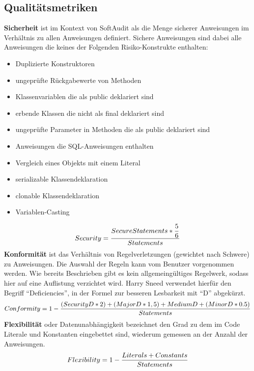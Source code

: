 \documentclass[gb,ngerman]{stthesis}
\begin{document}
		\subsection{Qualitätsmetriken}
			\textbf{Sicherheit} ist im Kontext von SoftAudit als die Menge sicherer Anweisungen im Verhältnis zu allen Anweisungen definiert. Sichere Anweisungen sind dabei alle Anweisungen die keines der Folgenden Risiko-Konstrukte enthalten: 
			\begin{itemize}
				\item Duplizierte Konstruktoren
				\item ungeprüfte Rückgabewerte von Methoden
				\item Klassenvariablen die als public deklariert sind
				\item erbende Klassen die nicht als final deklariert sind
				\item ungeprüfte Parameter in Methoden die als public deklariert sind
				\item Anweisungen die SQL-Anweisungen enthalten
				\item Vergleich eines Objekts mit einem Literal
				\item serializable Klassendeklaration
				\item clonable Klassendeklaration
				\item Variablen-Casting
			\end{itemize}
			\begin{equation}
				\small{Security = \dfrac{SecureStatements * \dfrac{5}{6}}{Statements}} 
			\end{equation} 
			\textbf{Konformität} ist das Verhältnis von Regelverletzungen (gewichtet nach Schwere) zu Anweisungen. Die Auswahl der Regeln kann vom Benutzer vorgenommen werden. Wie bereits Beschrieben gibt es kein allgemeingültiges Regelwerk, sodass hier auf eine Auflistung verzichtet wird. Harry Sneed verwendet hierfür den Begriff "`Deficiencies"', in der Formel zur besseren Lesbarkeit mit "`D"' abgekürzt.
			\begin{equation}
				\small{Conformity = 1 - \dfrac{(SecurityD * 2) + (MajorD * 1,5) + MediumD + (MinorD * 0.5)}{Statements}} 
			\end{equation} 
			\textbf{Flexibilität} oder Datenunabhängigkeit bezeichnet den Grad zu dem im Code Literale und Konstanten eingebettet sind, wiederum gemessen an der Anzahl der Anweisungen.
			\begin{equation}
				\small{Flexibility = 1 - \dfrac{Literals + Constants}{Statements}} 
			\end{equation}
\end{document}
